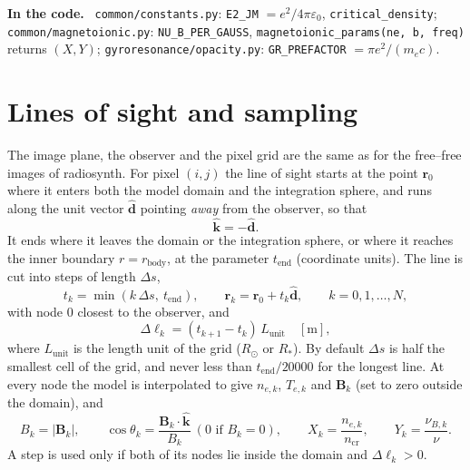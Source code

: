 \documentclass[11pt,a4paper]{article}
\newcommand{\code}[1]{\texttt{#1}}
\newcommand{\vect}[1]{\bm{#1}}
\newcommand{\ncr}{n_\mathrm{cr}}
\newcommand{\rsun}{R_\odot}
\newenvironment{incode}{\par\smallskip\noindent\begin{minipage}{\linewidth}\small\color{accent!80!black}\textbf{In the code.}~}{\end{minipage}\par\smallskip}
\begin{document}
\begin{incode}
\code{common/constants.py}: \code{E2\_JM} $=e^2/4\pi\varepsilon_0$, \code{critical\_density};
\code{common/magnetoionic.py}: \code{NU\_B\_PER\_GAUSS}, \code{magnetoionic\_params(ne, b, freq)}
returns $(X, Y)$; \code{gyroresonance/opacity.py}: \code{GR\_PREFACTOR} $=\pi e^2/(m_ec)$.
\end{incode}

\section{Lines of sight and sampling}\label{sec:geometry}

The image plane, the observer and the pixel grid are the same as for the free--free images of
\textsf{radiosynth}. For pixel $(i,j)$ the line of sight starts at the point $\vect r_0$ where
it enters both the model domain and the integration sphere, and runs along the unit vector
$\hat{\vect d}$ pointing \emph{away} from the observer, so that
\begin{equation}
  \hat{\vect k} = -\hat{\vect d}.
\end{equation}
It ends where it leaves the domain or the integration sphere, or where it reaches the inner
boundary $r=r_\text{body}$, at the parameter $t_\text{end}$ (coordinate units). The line is cut
into steps of length $\Delta s$,
\begin{equation}
  t_k=\min(k\,\Delta s,\ t_\text{end}),\qquad \vect r_k=\vect r_0+t_k\hat{\vect d},\qquad
  k=0,1,\ldots,N,
\end{equation}
with node 0 closest to the observer, and
\begin{equation}
  \Delta\ell_k=(t_{k+1}-t_k)\,L_\text{unit}\quad[\text{m}],
\end{equation}
where $L_\text{unit}$ is the length unit of the grid ($\rsun$ or $R_\ast$). By default
$\Delta s$ is half the smallest cell of the grid, and never less than $t_\text{end}/20000$ for
the longest line. At every node the model is interpolated to give $n_{e,k}$, $T_{e,k}$ and
$\vect B_k$ (set to zero outside the domain), and
\begin{equation}
  B_k=|\vect B_k|,\qquad
  \cos\theta_k=\frac{\vect B_k\cdot\hat{\vect k}}{B_k}\ (0\text{ if }B_k=0),\qquad
  X_k=\frac{n_{e,k}}{\ncr},\qquad Y_k=\frac{\nu_{B,k}}{\nu}.
\end{equation}
A step is used only if both of its nodes lie inside the domain and $\Delta\ell_k>0$.
\end{document}
